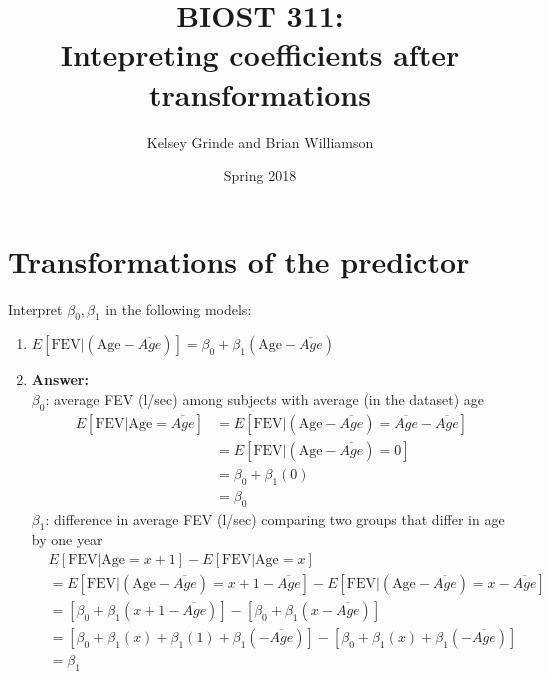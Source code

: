\documentclass{article}
\begin{document}
\title{BIOST 311: \\ Intepreting coefficients after transformations}
\author{Kelsey Grinde and Brian Williamson}
\date{Spring 2018}

\maketitle

\section{Transformations of the predictor}

Interpret $\beta_0, \beta_1$ in the following models:

\begin{enumerate}\itemsep +5pt
\item $E[\text{FEV}|\left(\text{Age}-\overline{Age}\right)] = \beta_0 + \beta_1 \left(\text{Age}-\overline{Age}\right)$ 
\item[] \color{blue} \textbf{Answer:} \\
$\beta_0$: average FEV (l/sec) among subjects with average (in the dataset) age \\
\begin{align*}
E[\text{FEV}|\text{Age} = \overline{Age}] &= E[\text{FEV}|\left(\text{Age}-\overline{Age}\right)=\overline{Age}-\overline{Age}]\\
& = E[\text{FEV}|\left(\text{Age}-\overline{Age}\right) =0]\\
& = \beta_0+ \beta_1(0) \\
& = \beta_0
\end{align*}
$\beta_1$: difference in average FEV (l/sec) comparing two groups that differ in age by one year
\begin{align*}
&E[\text{FEV}|\text{Age} = x + 1] - E[\text{FEV}|\text{Age} = x ] \\
&=E[\text{FEV}|\left(\text{Age}-\overline{Age}\right)= x + 1 - \overline{Age}] - E[\text{FEV}|\left(\text{Age}-\overline{Age}\right)= x  - \overline{Age}]\\
&=\left[\beta_0 + \beta_1\left( x + 1 - \overline{Age}\right)\right] - \left[\beta_0 + \beta_1\left( x  - \overline{Age}\right)\right] \\
&=\left[\beta_0 + \beta_1(x) + \beta_1 (1)  +\beta_1(-\overline{Age})\right] -\left[\beta_0 + \beta_1(x)  +\beta_1(-\overline{Age})\right]\\
& = \beta_1
\end{align*}
\color{black}


\end{enumerate}
\end{document}
